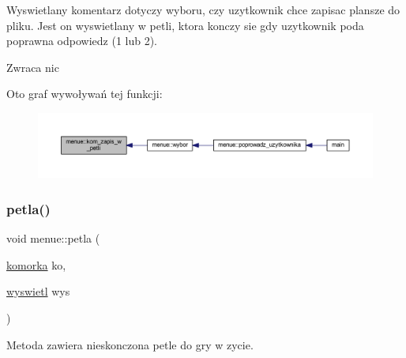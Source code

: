 Wyswietlany komentarz dotyczy wyboru, czy uzytkownik chce zapisac plansze do pliku. Jest on wyswietlany w petli, ktora konczy sie gdy uzytkownik poda poprawna odpowiedz (1 lub 2). \begin{DoxyReturn}{Zwraca}
nic 
\end{DoxyReturn}
Oto graf wywoływań tej funkcji\+:
\nopagebreak
\begin{figure}[H]
\begin{center}
\leavevmode
\includegraphics[width=350pt]{classmenue_a303502c5a160ee276a3ac7ce21ef4f4f_icgraph}
\end{center}
\end{figure}
\mbox{\label{classmenue_a13c6c317f85272bf3fd49ff0ad93b28a}} 
\subsubsection{\texorpdfstring{petla()}{petla()}}
{\footnotesize\ttfamily void menue\+::petla (\begin{DoxyParamCaption}\item[{\mbox{\hyperlink{classkomorka}{komorka}}}]{ko,  }\item[{\mbox{\hyperlink{classwyswietl}{wyswietl}}}]{wys }\end{DoxyParamCaption})\hspace{0.3cm}{\ttfamily [static]}}

Metoda zawiera nieskonczona petle do gry w zycie.

